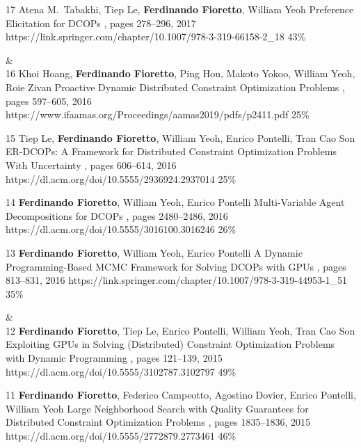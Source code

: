 \begin{pubs}
	\confentry 
		{17} %
		{Atena M.~Tabakhi, Tiep Le, {\bf Ferdinando Fioretto}, William Yeoh}
		{Preference Elicitation for DCOPs}
		{\procCP, pages 278--296, 2017}
		{https://link.springer.com/chapter/10.1007/978-3-319-66158-2\_18}
		{43\%}%

{}& \nemph{\rule{0.5\linewidth}{0.5pt}}\\[1em]
	\confentry 
		{16} %
		{Khoi Hoang, {\bf Ferdinando Fioretto}, Ping Hou, Makoto Yokoo, William Yeoh, Roie Zivan}
		{Proactive Dynamic Distributed Constraint Optimization Problems} 
		{\procAAMAS, pages 597--605, 2016}
		{https://www.ifaamas.org/Proceedings/aamas2019/pdfs/p2411.pdf}
		{25\%}%

	\confentry 
		{15} %
		{Tiep Le, {\bf Ferdinando Fioretto}, William Yeoh, Enrico Pontelli, Tran Cao Son} 
		{ER-DCOPs: A Framework for Distributed Constraint Optimization Problems With Uncertainty} 
		{\procAAMAS,	pages 606--614, 2016}
		{https://dl.acm.org/doi/10.5555/2936924.2937014}
		{25\%}%

	\confentry 
		{14} %
		{{\bf Ferdinando Fioretto}, William Yeoh, Enrico Pontelli}
		{Multi-Variable Agent Decompositions for DCOPs}
		{\procAAAI, pages 2480--2486, 2016}
		{https://dl.acm.org/doi/10.5555/3016100.3016246}
		{26\%}%

	\confentry
		{13} %
		{{\bf Ferdinando Fioretto}, William Yeoh, Enrico Pontelli}
		{A Dynamic Programming-Based MCMC Framework for Solving DCOPs with GPUs}
		{\procCP, pages 813--831,	2016}
		{https://link.springer.com/chapter/10.1007/978-3-319-44953-1\_51}
		{35\%}%

{}&\nemph{\rule{0.5\linewidth}{0.5pt}}\\[1em]
	\confentry
		{12} %
		{{\bf Ferdinando Fioretto}, Tiep Le, Enrico Pontelli, William Yeoh, Tran Cao Son}
		{Exploiting GPUs in Solving (Distributed) Constraint Optimization Problems with Dynamic Programming}
		{\procCP, pages 121--139, 2015}
		{https://dl.acm.org/doi/10.5555/3102787.3102797}
		{49\%}%

	\confentry
		{11} %
		{{\bf Ferdinando Fioretto}, Federico Campeotto, Agostino Dovier, Enrico Pontelli, William Yeoh}
		{Large Neighborhood Search with Quality Guarantees for Distributed Constraint Optimization Problems}
		{\procAAMAS, pages 1835--1836, 2015}
		{https://dl.acm.org/doi/10.5555/2772879.2773461}
		{46\%}


\end{pubs}
